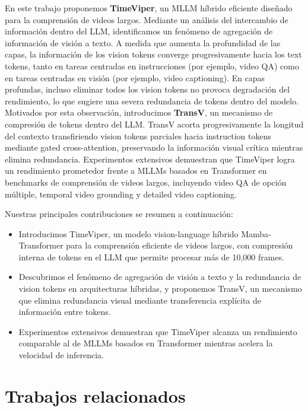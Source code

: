 \documentclass[10pt,twocolumn,letterpaper]{article}
\begin{document}
En este trabajo proponemos \textbf{TimeViper}, un MLLM híbrido eficiente diseñado para la comprensión de videos largos.
Mediante un análisis del intercambio de información dentro del LLM, identificamos un fenómeno de agregación de información de visión a texto.
A medida que aumenta la profundidad de las capas, la información de los vision tokens converge progresivamente hacia los text tokens, tanto en tareas centradas en instrucciones (por ejemplo, video QA) como en tareas centradas en visión (por ejemplo, video captioning).
En capas profundas, incluso eliminar todos los vision tokens no provoca degradación del rendimiento, lo que sugiere una severa redundancia de tokens dentro del modelo.
Motivados por esta observación, introducimos \textbf{TransV}, un mecanismo de compresión de tokens dentro del LLM.
TransV acorta progresivamente la longitud del contexto transfiriendo vision tokens parciales hacia instruction tokens mediante gated cross-attention, preservando la información visual crítica mientras elimina redundancia.
Experimentos extensivos demuestran que TimeViper logra un rendimiento prometedor frente a MLLMs basados en Transformer en benchmarks de comprensión de videos largos, incluyendo video QA de opción múltiple, temporal video grounding y detailed video captioning.

Nuestras principales contribuciones se resumen a continuación:
\begin{itemize}
    \item Introducimos TimeViper, un modelo vision-language híbrido Mamba-Transformer para la comprensión eficiente de videos largos, con compresión interna de tokens en el LLM que permite procesar más de 10,000 frames.
    \item Descubrimos el fenómeno de agregación de visión a texto y la redundancia de vision tokens en arquitecturas híbridas, y proponemos TransV, un mecanismo que elimina redundancia visual mediante transferencia explícita de información entre tokens.
    \item Experimentos extensivos demuestran que TimeViper alcanza un rendimiento comparable al de MLLMs basados en Transformer mientras acelera la velocidad de inferencia.
\end{itemize}




\section{Trabajos relacionados}
\label{sec:related_works}
\end{document}
